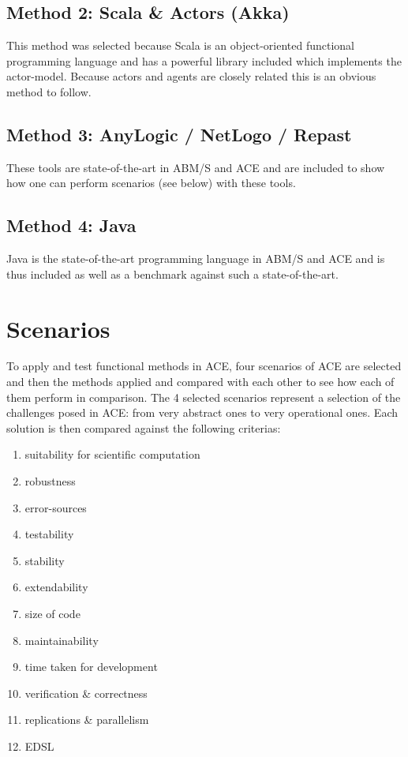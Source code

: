 \documentclass{article}
\begin{document}
\subsection{Method 2: Scala \& Actors (Akka)}
This method was selected because Scala is an object-oriented functional programming language and has a powerful library included which implements the actor-model. Because actors and agents are closely related this is an obvious method to follow.

\subsection{Method 3: AnyLogic / NetLogo / Repast}
These tools are state-of-the-art in ABM/S and ACE and are included to show how one can perform scenarios (see below) with these tools.

\subsection{Method 4: Java}
Java is the state-of-the-art programming language in ABM/S and ACE and is thus included as well as a benchmark against such a state-of-the-art.



\section{Scenarios}
To apply and test functional methods in ACE, four scenarios of ACE are selected and then the methods applied and compared with each other to see how each of them perform in comparison. The 4 selected scenarios represent a selection of the challenges posed in ACE: from very abstract ones to very operational ones. Each solution is then compared against the following criterias: 

\begin{enumerate}
\item suitability for scientific computation
\item robustness
\item error-sources
\item testability
\item stability
\item extendability
\item size of code
\item maintainability
\item time taken for development
\item verification \& correctness
\item replications \& parallelism
\item EDSL
\end{enumerate}
\end{document}
